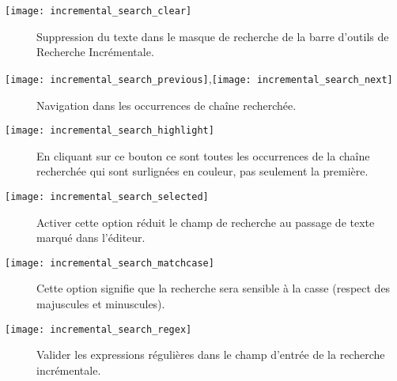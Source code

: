 \begin{description}
\item[\texttt{[image: incremental\_search\_clear]}] Suppression du texte dans le masque de recherche de la barre d'outils de Recherche Incrémentale.
\item[\texttt{[image: incremental\_search\_previous]},\texttt{[image: incremental\_search\_next]}] Navigation dans les occurrences de chaîne recherchée.
\item[\texttt{[image: incremental\_search\_highlight]}] En cliquant sur ce bouton ce sont toutes les occurrences de la chaîne recherchée qui sont surlignées en couleur, pas seulement la première.
\item[\texttt{[image: incremental\_search\_selected]}] Activer cette option réduit le champ de recherche au passage de texte marqué dans l'éditeur.
\item[\texttt{[image: incremental\_search\_matchcase]}] Cette option signifie que la recherche sera sensible à la casse (respect des majuscules et minuscules).
\item[\texttt{[image: incremental\_search\_regex]}] Valider les expressions régulières dans le champ d'entrée de la recherche incrémentale.
\end{description}


